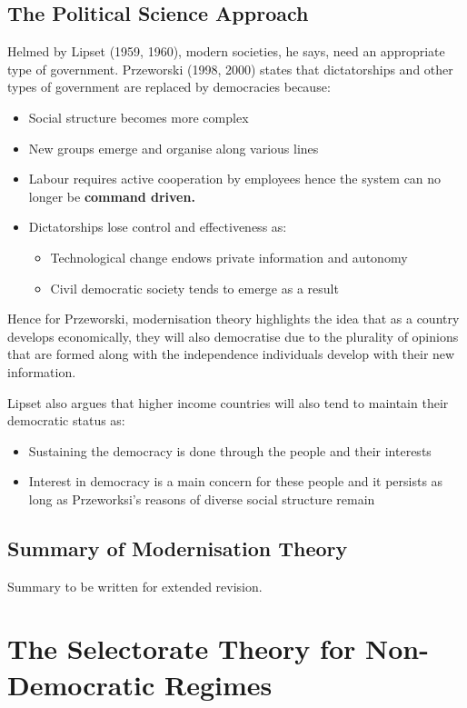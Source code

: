 \documentclass[12pt, letterpaper]{article}
\begin{document}
\subsection{The Political Science Approach}
Helmed by Lipset (1959, 1960), modern societies, he says, need an appropriate type of government. Przeworski (1998, 2000) states that dictatorships and other types of government are replaced by democracies because:
\begin{itemize}
	\item Social structure becomes more complex
	\item New groups emerge and organise along various lines
	\item Labour requires active cooperation by employees hence the system can no longer be \textbf{command driven.}
	\item Dictatorships lose control and effectiveness as:
		\begin{itemize}
			\item Technological change endows private information and autonomy
			\item Civil democratic society tends to emerge as a result
		\end{itemize}
\end{itemize}
Hence for Przeworski, modernisation theory highlights the idea that as a country develops economically, they will also democratise due to the plurality of opinions that are formed along with the independence individuals develop with their new information.

Lipset also argues that higher income countries will also tend to maintain their democratic status as:
\begin{itemize}
	\item Sustaining the democracy is done through the people and their interests
	\item Interest in democracy is a main concern for these people and it persists as long as Przeworksi's reasons of diverse social structure remain
\end{itemize}

\subsection{Summary of Modernisation Theory}
Summary to be written for extended revision.

\newpage
\section{The Selectorate Theory for Non-Democratic Regimes}
\end{document}

